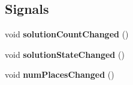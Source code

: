 \subsection*{Signals}
\begin{DoxyCompactItemize}
\item 
\hypertarget{classMainModel_a64cbb6676acd654918493189d3667ac8}{void {\bfseries solution\-Count\-Changed} ()}\label{classMainModel_a64cbb6676acd654918493189d3667ac8}

\item 
\hypertarget{classMainModel_a81d839de094a197583453b9c567eb8df}{void {\bfseries solution\-State\-Changed} ()}\label{classMainModel_a81d839de094a197583453b9c567eb8df}

\item 
\hypertarget{classMainModel_a77e0d8e44310724ffd717e6e5eb91b68}{void {\bfseries num\-Places\-Changed} ()}\label{classMainModel_a77e0d8e44310724ffd717e6e5eb91b68}

\end{DoxyCompactItemize}
